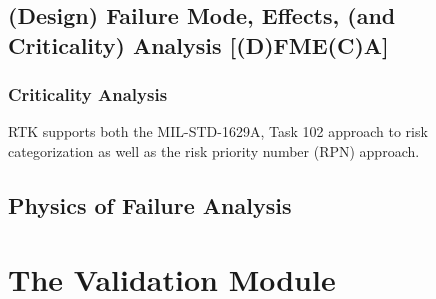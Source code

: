 \documentclass[twoside,12pt,letterpaper,openright]{book}
\begin{document}
\subsection{(Design) Failure Mode, Effects, (and Criticality) Analysis [(D)FME(C)A]}
\subsubsection{Criticality Analysis}

\noindent RTK supports both the MIL-STD-1629A, Task 102 approach to risk 
categorization as well as the risk priority number (RPN) approach.

\subsection{Physics of Failure Analysis}
\section{The Validation Module}
\end{document}
